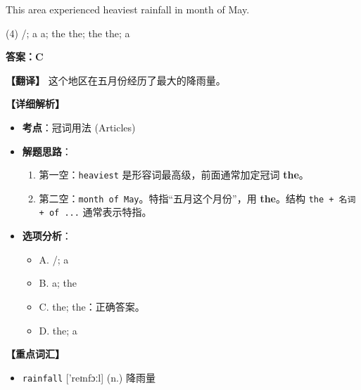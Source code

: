 \documentclass[11pt, a4paper]{article}
\newcommand{\analysis}[4]{
    \begin{solutionbox}
        \textbf{答案：#1}
        
        \textbf{【翻译】} #2
        
        \textbf{【详细解析】}
        #3
        
        \textbf{【重点词汇】}
        #4
    \end{solutionbox}
}
\newcommand{\blank}{\underline{\hspace{1.5cm}}}
\begin{document}
\begin{questions}
    \item This area experienced \blank heaviest rainfall in \blank month of May.
    \begin{tasks}(4)
        \task /; a \task a; the \task the; the \task the; a
    \end{tasks}
    \analysis{C}{这个地区在五月份经历了最大的降雨量。}{
        \begin{itemize}
            \item \textbf{考点}：冠词用法 (Articles)
            \item \textbf{解题思路}：
                \begin{enumerate}
                    \item 第一空：\texttt{heaviest} 是形容词最高级，前面通常加定冠词 \textbf{the}。
                    \item 第二空：\texttt{month of May}。特指“五月这个月份”，用 \textbf{the}。结构 \texttt{the + 名词 + of ...} 通常表示特指。
                \end{enumerate}
            \item \textbf{选项分析}：
                \begin{itemize}
                    \item A. /; a
                    \item B. a; the
                    \item C. the; the：正确答案。
                    \item D. the; a
                \end{itemize}
        \end{itemize}
    }{
        \begin{itemize}
            \item \texttt{rainfall} ['reɪnfɔːl] (n.) 降雨量
        \end{itemize}
    }


\end{questions}
\end{document}
